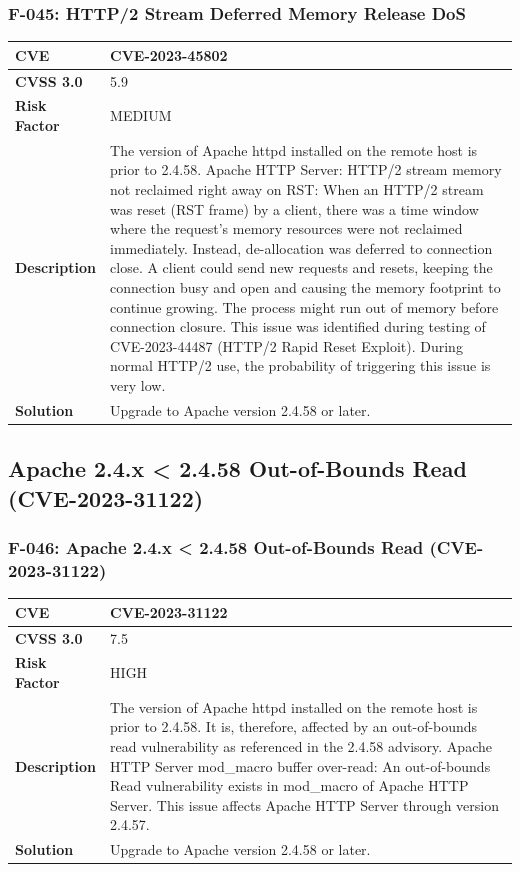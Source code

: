 \subsubsection{F-045: HTTP/2 Stream Deferred Memory Release DoS}
\begin{tabular}{|p{2.8cm}|p{12.2cm}|}
\hline
\textbf{CVE} & CVE-2023-45802 \\ \hline
\textbf{CVSS 3.0} & 5.9 \\ \hline
\textbf{Risk Factor} & MEDIUM \\ \hline
\textbf{Description} & The version of Apache httpd installed on the remote host is prior to 2.4.58. Apache HTTP Server: HTTP/2 stream memory not reclaimed right away on RST: When an HTTP/2 stream was reset (RST frame) by a client, there was a time window where the request's memory resources were not reclaimed immediately. Instead, de-allocation was deferred to connection close. A client could send new requests and resets, keeping the connection busy and open and causing the memory footprint to continue growing. The process might run out of memory before connection closure. This issue was identified during testing of CVE-2023-44487 (HTTP/2 Rapid Reset Exploit). During normal HTTP/2 use, the probability of triggering this issue is very low. \\ \hline
\textbf{Solution} & Upgrade to Apache version 2.4.58 or later. \\ \hline
\end{tabular}

%
%
\subsection{Apache 2.4.x < 2.4.58 Out-of-Bounds Read (CVE-2023-31122)}

\subsubsection{F-046: Apache 2.4.x < 2.4.58 Out-of-Bounds Read (CVE-2023-31122)}
\begin{tabular}{|p{2.8cm}|p{12.2cm}|}
\hline
\textbf{CVE} & CVE-2023-31122 \\ \hline
\textbf{CVSS 3.0} & 7.5 \\ \hline
\textbf{Risk Factor} & HIGH \\ \hline
\textbf{Description} & The version of Apache httpd installed on the remote host is prior to 2.4.58. It is, therefore, affected by an out-of-bounds read vulnerability as referenced in the 2.4.58 advisory. Apache HTTP Server mod\_macro buffer over-read: An out-of-bounds Read vulnerability exists in mod\_macro of Apache HTTP Server. This issue affects Apache HTTP Server through version 2.4.57. \\ \hline
\textbf{Solution} & Upgrade to Apache version 2.4.58 or later. \\ \hline
\end{tabular}

